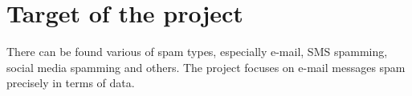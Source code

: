﻿\section{Target of the project}
There can be found various of spam types, especially e-mail, SMS spamming, social media spamming and others. The project focuses on e-mail messages spam precisely in terms of data.